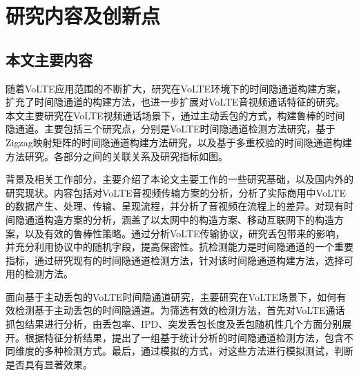 \section{研究内容及创新点}
\label{sec:intro:work}

\subsection{本文主要内容}
\label{sec:intro:work:mainwork}

随着VoLTE应用范围的不断扩大，研究在VoLTE环境下的时间隐通道构建方案，扩充了时间隐通道的构建方法，也进一步扩展对VoLTE音视频通话特征的研究。本文主要研究在VoLTE视频通话场景下，通过主动丢包的方式，构建鲁棒的时间隐通道。主要包括三个研究点，分别是VoLTE时间隐通道检测方法研究，基于Zigzag映射矩阵的时间隐通道构建方法研究，以及基于多重校验的时间隐通道构建方法研究。各部分之间的关联关系及研究指标如图。


背景及相关工作部分，主要介绍了本论文主要工作的一些研究基础，以及国内外的研究现状。内容包括对VoLTE音视频传输方案的分析，分析了实际商用中VoLTE的数据产生、处理、传输、呈现流程，并分析了音视频在流程上的差异。对现有时间隐通道构造方案的分析，涵盖了以太网中的构造方案、移动互联网下的构造方案，以及有效的鲁棒性策略。通过分析VoLTE传输协议，研究丢包带来的影响，并充分利用协议中的随机字段，提高保密性。抗检测能力是时间隐通道的一个重要指标，通过研究现有的时间隐通道检测方法，针对该时间隐通道构建方法，选择可用的检测方法。

面向基于主动丢包的VoLTE时间隐通道研究，主要研究在VoLTE场景下，如何有效检测基于主动丢包的时间隐通道。为筛选有效的检测方法，首先对VoLTE通话抓包结果进行分析，由丢包率、IPD、突发丢包长度及丢包随机性几个方面分别展开。根据特征分析结果，提出了一组基于统计分析的时间隐通道检测方法，包含不同维度的多种检测方式。最后，通过模拟的方式，对这些方法进行模拟测试，判断是否具有显著效果。


